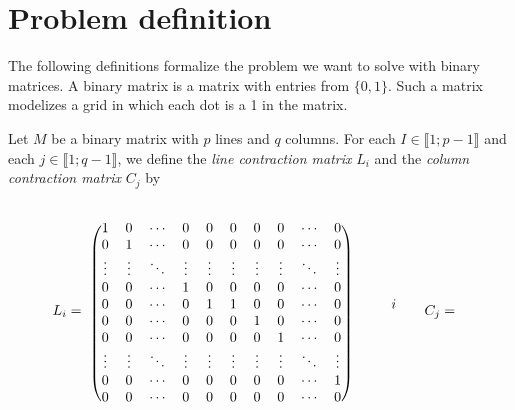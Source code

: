 \section{Problem definition}
\label{sec:problemdef}

The following definitions formalize the problem we want to solve with binary matrices. A binary matrix is a matrix with entries from $\{0,1\}$. Such a matrix modelizes a grid in which each dot is a 1 in the matrix.

\begin{definition}
Let $M$ be a binary matrix with $p$ lines and $q$ columns. For each $I \in \llbracket 1; p-1 \rrbracket$ and each $j \in \llbracket 1; q-1 \rrbracket$, we define the \emph{line contraction matrix} $L_i$ and the \emph{column contraction matrix} $C_j$ by 

$$L_i = \hspace{0.2cm}\begin{blockarray}{ccccccccccccc}
& & & & & & & & & & &\\
\begin{block}{(cccccccccc)ccc}
1      &  0     & \cdots & 0      & 0 & 0 &  0  & 0 & \cdots & 0 &&&\\
0      &  1     & \cdots & 0      & 0 & 0 &  0  & 0 & \cdots & 0 &&&\\
\vdots & \vdots & \ddots & \vdots & \vdots & \vdots &  \vdots  & \vdots & \ddots  & \vdots  &&&\\
0      &   0    &\cdots  & 1      & 0 & 0 &  0  & 0 & \cdots & 0 &&&\\ 
0      &   0    &\cdots  & 0      & 1 & 1 &  0  & 0 & \cdots & 0 & && i\\ 
0      &   0    &\cdots  & 0      & 0 & 0 &  1  & 0 & \cdots & 0 &&&\\
0      &   0    &\cdots  & 0      & 0 & 0 &  0  & 1 & \cdots & 0 &&&\\ 
\vdots      &   \vdots    &\ddots  & \vdots     & \vdots & \vdots & \vdots & \vdots & \ddots & \vdots  &&&\\
0      &   0    &\cdots  & 0      & 0 & 0  &  0 & 0 & \cdots & 1 &&&\\
0      &   0    &\cdots  & 0      & 0 & 0      &   0    & 0      &\cdots  & 0 &&&\\
\end{block}
\end{blockarray}
\hspace{0.5cm}
C_j = \hspace{0.2cm}\begin{blockarray}{ccccccccccc}

\end{blockarray}$$
\end{definition}
